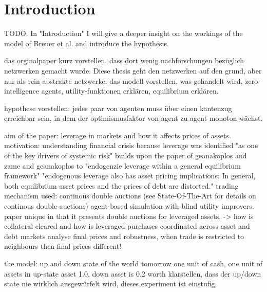 \documentclass[Bachelorarbeit.tex]{subfiles}
\begin{document}
\chapter{Introduction}
TODO:
In "Introduction" I will give a deeper insight on the workings of the model of Breuer et al. and introduce the hypothesis.

das orginalpaper kurz vorstellen, dass dort wenig nachforschungen bezüglich netzwerken gemacht wurde. Diese thesis geht den netzwerken auf den grund, aber nur als rein abstrakte netzwerke.
das modell vorstellen, was gehandelt wird, zero-intelligence agents, utility-funktionen erklären, equilibrium erklären.

hypothese vorstellen: jedes paar von agenten muss über einen kantenzug erreichbar sein, in dem der optimismusfaktor von agent zu agent monoton wächst.


aim of the paper:
leverage in markets and how it affects prices of assets.
motivation: understanding financial crisis because leverage was identified "as one of the key drivers of systemic risk"
builds upon the paper of geanakoplos and zame and geanakoplos to "endogenzie leverage within a general equilibrium framework"
"endogenous leverage also has asset pricing implications: In general, both equilibrium asset prices and the prices of debt are distorted."
trading mechanism used: continous double auctions (see State-Of-The-Art for details on continous double auctions)
agent-based simulation with blind utility improvers.
paper unique in that it presents double auctions for leveraged assets.
	-> how is collateral cleared and how is leveraged purchases coordinated across asset and debt markets
analyse final prices and robustness, when trade is restricted to neighbours then final prices different!

the model:
up and down state of the world tomorrow
one unit of cash, one unit of assets
in up-state asset 1.0, down asset is 0.2 worth
klarstellen, dass der up/down state nie wirklich ausgewürfelt wird, dieses experiment ist einstufig.
\end{document}
